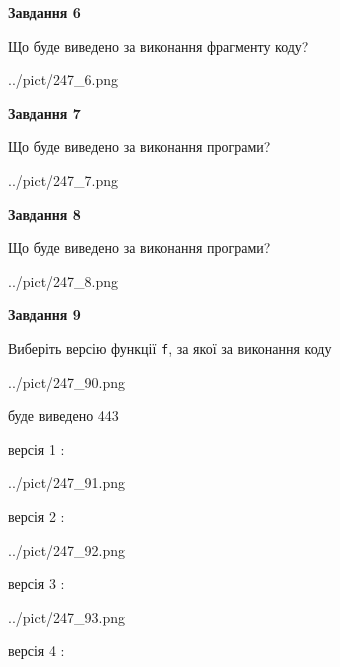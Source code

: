 \documentclass[12pt, ukrainian]{article}
\def\code#1{\Verb!#1!}
\begin{document}
{\begin {large}
{\begin {center}\textbf{Завдання 6}\end {center}}

Що буде виведено за виконання фрагменту коду?\par
\begin{center}
	{../pict/247_6.png}
\end{center}
\newpage

{\begin {center}\textbf{Завдання 7}\end {center}}

Що буде виведено за виконання програми?\par
\begin{center}
	{../pict/247_7.png}
\end{center}
\newpage

{\begin {center}\textbf{Завдання 8}\end {center}}

Що буде виведено за виконання програми?\par
\begin{center}
	{../pict/247_8.png}
\end{center}
\newpage

{\begin {center}\textbf{Завдання 9}\end {center}}

Виберіть версію функції \code{f}, за якої за виконання коду
\begin{center}
	{../pict/247_90.png}
\end{center}
буде виведено 443

\vspace{5mm}
версія 1 :

\begin{center}
	{../pict/247_91.png}
\end{center}
версія 2 :

\begin{center}
	{../pict/247_92.png}
\end{center}
версія 3 :

\begin{center}
	{../pict/247_93.png}
\end{center}
версія 4 :


\end{large}}
\end{document}
